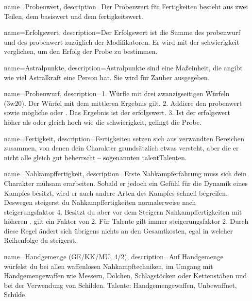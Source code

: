 {
    name={Probenwert},
    description={Der Probenwert für Fertigkeiten besteht aus zwei Teilen, dem \gls{basiswert} und dem \gls{fertigkeitswert}.}}

{
    name={Erfolgswert},
    description={Der Erfolgswert ist die Summe des \gls{probenwurf} und des \gls{probenwert} zuzüglich der Modifikatoren. Er wird mit der \gls{schwierigkeit} verglichen, um den Erfolg der Probe zu bestimmen.}}

{
    name={Astralpunkte},
    description={Astralpunkte sind eine Maßeinheit, die angibt wie viel Astralkraft eine Person hat. Sie wird für Zauber ausgegeben.}}

{
    name={Probenwurf},
    description={1. Würfle mit drei zwanzigseitigen Würfeln (\gls{3w20}). Der
Würfel mit dem mittleren Ergebnis gilt. 2. Addiere den \gls{probenwert} sowie
mögliche  oder . Das
Ergebnis ist der \gls{erfolgswert}. 3. Ist der \gls{erfolgswert} höher als oder gleich hoch wie die
\gls{schwierigkeit}, gelingt die Probe.}}

{
    name={Fertigkeit},
    description={Fertigkeiten setzen sich aus verwandten Bereichen zusammen, von denen dein Charakter grundsätzlich etwas versteht, aber die er nicht alle gleich gut beherrscht – sogenannten \gls{talent}{Talenten}.}}

{
    name={Nahkampffertigkeit},
    description={Erste Nahkampferfahrung muss sich dein Charakter mühsam erarbeiten. Sobald er jedoch ein Gefühl für die Dynamik eines Kampfes besitzt, wird er auch andere Arten des Kampfes schnell begreifen. Deswegen steigerst du Nahkampffertigkeiten normalerweise nach \gls{steigerungsfaktor} 4. Besitzt du aber vor dem Steigern Nahkampffertigkeiten mit höheren , gilt ein Faktor von 2. Für Talente gilt immer \gls{steigerungsfaktor} 2. Durch diese Regel ändert sich übrigens nichts an den Gesamtkosten, egal in welcher Reihenfolge du steigerst.}}

{
    name={Handgemenge (GE/KK/MU, 4/2)},
    description={Auf Handgemenge würfelst du bei allen waffenlosen Nahkampftechniken, im Umgang mit Handgemengewaffen wie Messern, Dolchen, Schlagstöcken oder Kettenstäben und bei der Verwendung von Schilden. Talente: Handgemengewaffen, Unbewaffnet, Schilde.}}

